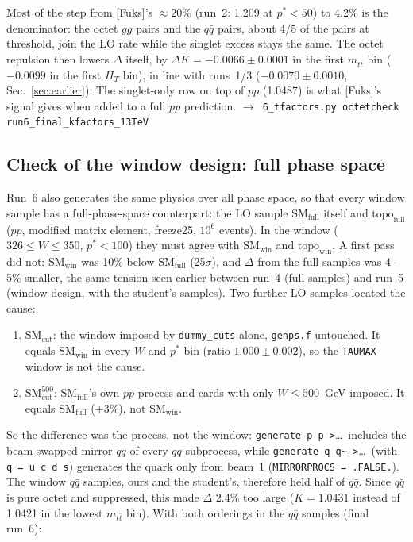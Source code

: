 \documentclass[11pt]{article}
\newcommand{\code}[1]{\texttt{#1}}
\newcommand{\Fuks}{[Fuks]}
\newcommand{\fn}[1]{\hfill$\to$~\code{#1}}
\newcommand{\SMfull}{\mathrm{SM}_\mathrm{full}}
\newcommand{\SMwin}{\mathrm{SM}_\mathrm{win}}
\newcommand{\topowin}{\mathrm{topo}_\mathrm{win}}
\newcommand{\topofull}{\mathrm{topo}_\mathrm{full}}
\newcommand{\SMcut}{\mathrm{SM}_\mathrm{cut}}
\begin{document}
Most of the step from \Fuks's $\approx20\%$ (run~2: 1.209 at $p^*<50$) to 4.2\% is the denominator: the octet $gg$ pairs and the
$q\bar q$ pairs, about $4/5$ of the pairs at threshold, join the LO rate while the singlet excess stays the same. The octet
repulsion then lowers $\Delta$ itself, by $\Delta K=-0.0066\pm0.0001$ in the first $m_{t\bar t}$ bin ($-0.0099$ in the first $H_T$
bin), in line with runs~1/3 ($-0.0070\pm0.0010$, Sec.~\ref{sec:earlier}). The singlet-only row on top of $pp$ (1.0487) is what
\Fuks's signal gives when added to a full $pp$ prediction. \fn{6\_tfactors.py octetcheck run6\_final\_kfactors\_13TeV}

\subsection{Check of the window design: full phase space}
\label{sec:windowcheck}
Run~6 also generates the same physics over all phase space, so that every window sample has a full-phase-space counterpart: the
LO sample $\SMfull$ itself and $\topofull$ ($pp$, modified matrix element, freeze25, $10^6$ events). In the window
($326\le W\le350$, $p^*<100$) they must agree with $\SMwin$ and $\topowin$. A first pass did not: $\SMwin$ was 10\% below
$\SMfull$ (25$\sigma$), and $\Delta$ from the full samples was 4--5\% smaller, the same tension seen earlier between run~4 (full
samples) and run~5 (window design, with the student's samples). Two further LO samples located the cause:
\begin{enumerate}
  \item $\SMcut$: the window imposed by \code{dummy\_cuts} alone, \code{genps.f} untouched. It equals $\SMwin$ in every $W$ and $p^*$
        bin (ratio $1.000\pm0.002$), so the \code{TAUMAX} window is not the cause.
  \item $\SMcut^{500}$: $\SMfull$'s own $pp$ process and cards with only $W\le500$~GeV imposed. It equals $\SMfull$ ($+3\%$), not $\SMwin$.
\end{enumerate}
So the difference was the process, not the window: \code{generate p p >}\ldots\ includes the beam-swapped mirror $\bar qq$ of every
$q\bar q$ subprocess, while \code{generate q q\~{} >}\ldots\ (with \code{q = u c d s}) generates the quark only from beam~1
(\code{MIRRORPROCS = .FALSE.}). The window $q\bar q$ samples, ours and the student's, therefore held half of $q\bar q$. Since
$q\bar q$ is pure octet and suppressed, this made $\Delta$ 2.4\% too large ($K=1.0431$ instead of 1.0421 in the lowest $m_{t\bar t}$ bin).
With both orderings in the $q\bar q$ samples (final run~6):
\end{document}
